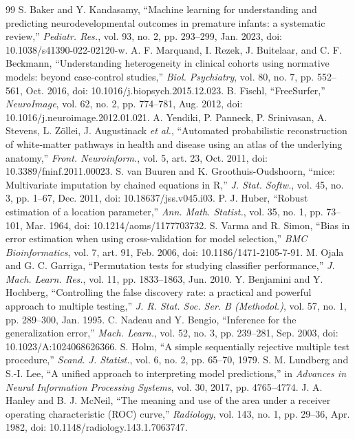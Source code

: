 \documentclass[conference,letterpaper,10pt]{IEEEtran}
\begin{document}
\begin{thebibliography}{99}
 S. Baker and Y. Kandasamy, ``Machine learning for understanding and predicting neurodevelopmental outcomes in premature infants: a systematic review,'' \emph{Pediatr. Res.}, vol. 93, no. 2, pp. 293--299, Jan. 2023, doi: 10.1038/s41390-022-02120-w.
 A. F. Marquand, I. Rezek, J. Buitelaar, and C. F. Beckmann, ``Understanding heterogeneity in clinical cohorts using normative models: beyond case-control studies,'' \emph{Biol. Psychiatry}, vol. 80, no. 7, pp. 552--561, Oct. 2016, doi: 10.1016/j.biopsych.2015.12.023.
 B. Fischl, ``FreeSurfer,'' \emph{NeuroImage}, vol. 62, no. 2, pp. 774--781, Aug. 2012, doi: 10.1016/j.neuroimage.2012.01.021.
 A. Yendiki, P. Panneck, P. Srinivasan, A. Stevens, L. Zöllei, J. Augustinack \emph{et al.}, ``Automated probabilistic reconstruction of white-matter pathways in health and disease using an atlas of the underlying anatomy,'' \emph{Front. Neuroinform.}, vol. 5, art. 23, Oct. 2011, doi: 10.3389/fninf.2011.00023.
 S. van Buuren and K. Groothuis-Oudshoorn, ``mice: Multivariate imputation by chained equations in R,'' \emph{J. Stat. Softw.}, vol. 45, no. 3, pp. 1--67, Dec. 2011, doi: 10.18637/jss.v045.i03.
 P. J. Huber, ``Robust estimation of a location parameter,'' \emph{Ann. Math. Statist.}, vol. 35, no. 1, pp. 73--101, Mar. 1964, doi: 10.1214/aoms/1177703732.
 S. Varma and R. Simon, ``Bias in error estimation when using cross-validation for model selection,'' \emph{BMC Bioinformatics}, vol. 7, art. 91, Feb. 2006, doi: 10.1186/1471-2105-7-91.
 M. Ojala and G. C. Garriga, ``Permutation tests for studying classifier performance,'' \emph{J. Mach. Learn. Res.}, vol. 11, pp. 1833--1863, Jun. 2010.
 Y. Benjamini and Y. Hochberg, ``Controlling the false discovery rate: a practical and powerful approach to multiple testing,'' \emph{J. R. Stat. Soc. Ser. B (Methodol.)}, vol. 57, no. 1, pp. 289--300, Jan. 1995.
 C. Nadeau and Y. Bengio, ``Inference for the generalization error,'' \emph{Mach. Learn.}, vol. 52, no. 3, pp. 239--281, Sep. 2003, doi: 10.1023/A:1024068626366.
 S. Holm, ``A simple sequentially rejective multiple test procedure,'' \emph{Scand. J. Statist.}, vol. 6, no. 2, pp. 65--70, 1979.
 S. M. Lundberg and S.-I. Lee, ``A unified approach to interpreting model predictions,'' in \emph{Advances in Neural Information Processing Systems}, vol. 30, 2017, pp. 4765--4774.
 J. A. Hanley and B. J. McNeil, ``The meaning and use of the area under a receiver operating characteristic (ROC) curve,'' \emph{Radiology}, vol. 143, no. 1, pp. 29--36, Apr. 1982, doi: 10.1148/radiology.143.1.7063747.
\end{thebibliography}
\end{document}
